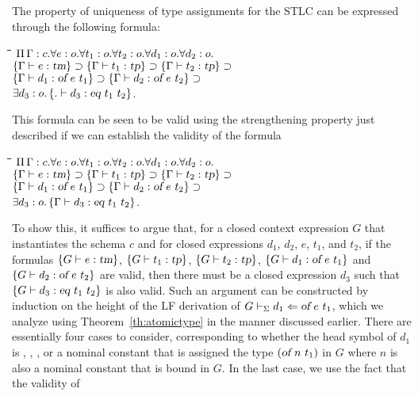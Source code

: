 The property of uniqueness of type assignments for the STLC can be expressed through the
following formula:
\begin{tabbing}
\qquad\=\qquad\=\qquad\=\qquad\=\kill
\>$\Pi\,\Gamma : c.\forall e:o. \forall t_1:o. \forall t_2:o. \forall d_1:o. \forall d_2:o.$\\
\>\>$\left\{\Gamma \vdash e:\mbox{\sl tm}\right\}\supset \left\{\Gamma \vdash t_1:\mbox{\sl tp}\right\}\supset \left\{\Gamma \vdash t_2:\mbox{\sl tp}\right\}\supset$\\
\>\>\> $\left\{\Gamma \vdash d_1:\mbox{\sl of}\  e\  t_1\right\}\supset \left\{\Gamma \vdash d_2:\mbox{\sl of}\  e\  t_2\right\}\supset$\\
\>\>\>\> $\exists d_3:o. \left\{. \vdash d_3:\mbox{\sl eq}\  t_1\  t_2\right\}$.
\end{tabbing}
%
This formula can be seen to be valid using the strengthening property
just described if we can establish the validity of the formula
\begin{tabbing}
\qquad\=\qquad\=\qquad\=\qquad\=\kill
\>$\Pi\,\Gamma : c.\forall e:o. \forall t_1:o. \forall t_2:o. \forall d_1:o. \forall d_2:o.$\\
\>\>$\left\{\Gamma \vdash e:\mbox{\sl tm}\right\}\supset \left\{\Gamma \vdash t_1:\mbox{\sl tp}\right\}\supset \left\{\Gamma \vdash t_2:\mbox{\sl tp}\right\}\supset$\\
\>\>\> $\left\{\Gamma \vdash d_1:\mbox{\sl of}\  e\  t_1\right\}\supset \left\{\Gamma \vdash d_2:\mbox{\sl of}\  e\  t_2\right\}\supset$\\
\>\>\>\> $\exists d_3:o. \left\{\Gamma \vdash d_3:\mbox{\sl eq}\  t_1\  t_2\right\}$.
\end{tabbing}
To show this, it suffices to argue that, for a closed context
expression $G$ that instantiates the schema $c$ and for closed
expressions $d_1$, $d_2$, $e$, $t_1$, and $t_2$, if the formulas
$\left\{G \vdash e:\mbox{\sl tm}\right\}$, $\left\{G \vdash t_1:\mbox{\sl tp}\right\}$, 
$\left\{G \vdash t_2:\mbox{\sl tp}\right\}$, $\left\{G \vdash d_1 : \mbox{\sl of}\  e\  t_1\right\}$ and 
$\left\{G \vdash d_2 : \mbox{\sl of}\  e\  t_2\right\}$ are valid, then there must be a
closed expression $d_3$ such that
$\left\{G \vdash d_3 : \mbox{\sl eq}\  t_1\  t_2\right\}$ is also valid.
%
Such an argument can be constructed by induction on the height
of the LF derivation of $G \vdash_{\Sigma} d_1\Leftarrow \mbox{\sl of}\  e\  t_1$,
which we analyze using Theorem~\ref{th:atomictype} in the manner
discussed earlier. 
%
There are essentially four cases to consider, corresponding to
whether the head symbol of $d_1$ is \ofemptytm, \ofapptm, 
\oflamtm, or a nominal constant that is assigned the type
$(\mbox{\sl of}\  n\  t_1)$ in $G$ where $n$ is also a nominal constant that
is bound in $G$.
%
In the last case, we use the fact that the validity of
